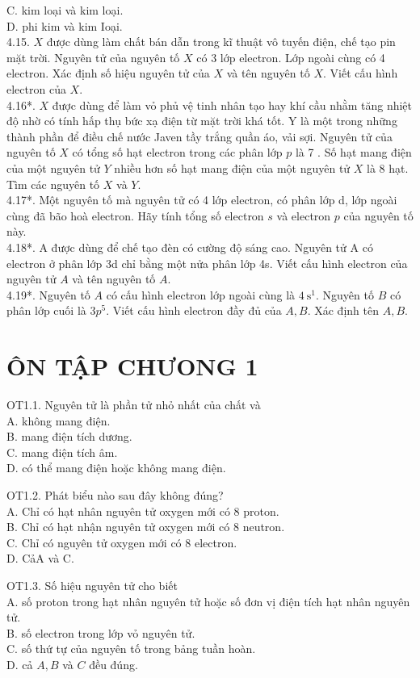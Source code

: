\documentclass[10pt]{article}
\begin{document}
C. kim loại và kim loại.\\
D. phi kim và kim Ioại.\\
4.15. $X$ được dùng làm chất bán dẫn trong kĩ thuật vô tuyến điện, chế tạo pin mặt trời. Nguyên tử của nguyên tố $X$ có 3 lớp electron. Lớp ngoài cùng có 4 electron. Xác định số hiệu nguyên tử của $X$ và tên nguyên tố $X$. Viết cấu hình electron của $X$.\\
4.16*. $X$ được dùng để làm vỏ phủ vệ tinh nhân tạo hay khí cầu nhằm tăng nhiệt độ nhờ có tính hấp thụ bức xạ điện từ mặt trời khá tốt. Y là một trong những thành phần để điều chế nước Javen tầy trắng quần áo, vải sợi. Nguyên tử của nguyên tố $X$ có tổng số hạt electron trong các phân lớp $p$ là 7 . Số hạt mang điện của một nguyên tử $Y$ nhiều hơn số hạt mang điện của một nguyên tử $X$ là 8 hạt. Tìm các nguyên tố $X$ và $Y$.\\
4.17*. Một nguyên tố mà nguyên tử có 4 lớp electron, có phân lớp d, lớp ngoài cùng đã bão hoà electron. Hãy tính tổng số electron $s$ và electron $p$ của nguyên tố này.\\
4.18*. A được dùng để chế tạo đèn có cường độ sáng cao. Nguyên tử A có electron ở phân lớp 3d chỉ bằng một nửa phân lớp 4s. Viết cấu hình electron của nguyên tử $A$ và tên nguyên tố $A$.\\
4.19*. Nguyên tố $A$ có cấu hình electron lớp ngoài cùng là $4 \mathrm{~s}^{1}$. Nguyên tố $B$ có phân lớp cuối là $3 p^{5}$. Viết cấu hình electron đầy đủ của $A, B$. Xác định tên $A, B$.

\section*{ÔN TẬP CHƯONG 1}
OT1.1. Nguyên tử là phần tử nhỏ nhất của chất và\\
A. không mang điện.\\
B. mang điện tích dương.\\
C. mang điện tích âm.\\
D. có thể mang điện hoặc không mang điện.

OT1.2. Phát biểu nào sau đây không đúng?\\
A. Chỉ có hạt nhân nguyên tử oxygen mới có 8 proton.\\
B. Chỉ có hạt nhận nguyên tử oxygen mới có 8 neutron.\\
C. Chỉ có nguyên tử oxygen mới có 8 electron.\\
D. CảA và C.

OT1.3. Số hiệu nguyên tử cho biết\\
A. số proton trong hạt nhân nguyên tử hoặc số đơn vị điện tích hạt nhân nguyên tử.\\
B. số electron trong lớp vỏ nguyên tử.\\
C. số thứ tự của nguyên tố trong bảng tuần hoàn.\\
D. cả $A, B$ và $C$ đều đúng.
\end{document}
